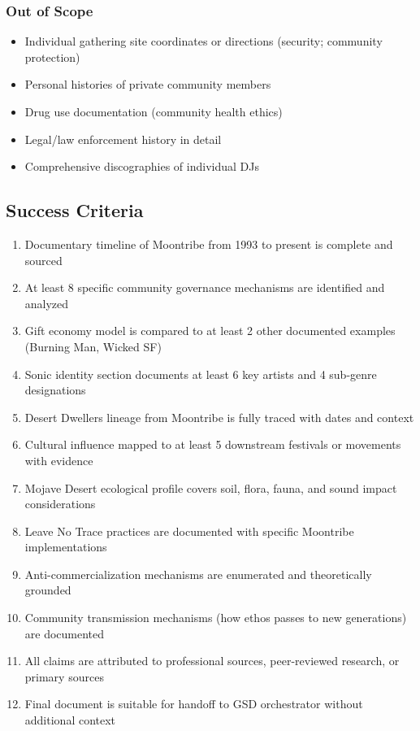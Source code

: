 \documentclass[11pt,letterpaper]{article}
\begin{document}
\subsubsection{Out of Scope}

\begin{itemize}[nosep]
  \item Individual gathering site coordinates or directions (security; community protection)
  \item Personal histories of private community members
  \item Drug use documentation (community health ethics)
  \item Legal/law enforcement history in detail
  \item Comprehensive discographies of individual DJs
\end{itemize}

\subsection{Success Criteria}

\begin{enumerate}
  \item Documentary timeline of Moontribe from 1993 to present is complete and sourced
  \item At least 8 specific community governance mechanisms are identified and analyzed
  \item Gift economy model is compared to at least 2 other documented examples (Burning Man, Wicked SF)
  \item Sonic identity section documents at least 6 key artists and 4 sub-genre designations
  \item Desert Dwellers lineage from Moontribe is fully traced with dates and context
  \item Cultural influence mapped to at least 5 downstream festivals or movements with evidence
  \item Mojave Desert ecological profile covers soil, flora, fauna, and sound impact considerations
  \item Leave No Trace practices are documented with specific Moontribe implementations
  \item Anti-commercialization mechanisms are enumerated and theoretically grounded
  \item Community transmission mechanisms (how ethos passes to new generations) are documented
  \item All claims are attributed to professional sources, peer-reviewed research, or primary sources
  \item Final document is suitable for handoff to GSD orchestrator without additional context
\end{enumerate}
\end{document}
